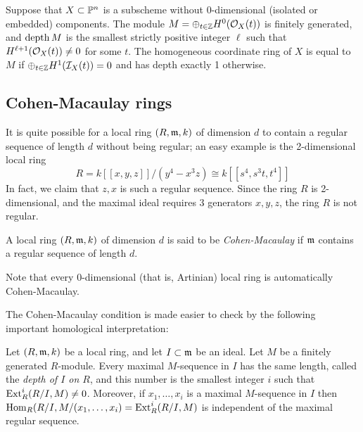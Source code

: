 \begin{theorem}\label{Auslander-Buchsbaum} Suppose that $X\subset \PP^{n}$ is a  subscheme without 0-dimensional (isolated or embedded) components. The module $M = \oplus_{t\in \ZZ}H^{0}(\cO_{X}(t))$
is finitely generated, and $\depth M$ is the smallest strictly positive integer $\ell$ such that 
$H^{\ell+1}(\cO_{X}(t)) \neq 0$  for some $t$. The homogeneous coordinate ring of $X$ is equal to $M$ if
$\oplus_{t\in \ZZ}H^{1}(\cI_{X}(t)) = 0$ and has depth exactly 1 otherwise.
\end{theorem}



 \subsection{Cohen-Macaulay rings}

 It is quite possible for a local ring $(R,\gm, k)$ of dimension $d$ to contain a regular sequence of length $d$
 without being regular; an easy example is the 2-dimensional local ring
 $$
 R = k[[x,y, z]]/(y^{4}-x^{3}z) \cong k[[s^{4}, s^{3}t, t^{4}]]
 $$
In fact, we claim that $z,x$ is such a regular sequence. Since the ring $R$ is 2-dimensional, and the maximal ideal requires 3 generators $x,y,z$, the ring $R$ is not regular. 

\begin{definition}
A local ring $(R,\gm,k)$ of dimension $d$ is said to be \emph{Cohen-Macaulay}  if $\gm$ contains a regular sequence of length $d$.
\end{definition}
 Note that every 0-dimensional (that is, Artinian) local ring is automatically Cohen-Macaulay.
 
The Cohen-Macaulay condition is made easier to check by the following important homological interpretation:

\begin{theorem}\label{depth}
Let $(R,\gm, k)$ be a local ring, and let $I\subset \gm$ be an ideal. 
Let $M$ be a finitely generated 
 $R$-module. Every maximal $M$-sequence in $I$ has the same length, called the \emph{depth of $I$ on $R$}, and this number is the smallest integer $i$ such that
 $\Ext^{i}_{R}(R/I, M)\neq 0$. Moreover, if $x_{1}, \dots, x_{i}$ is a maximal $M$-sequence
 in $I$ then $\Hom_{R}(R/I, M/(x_{1}, \dots, x_{i})= \Ext^{i}_{R}(R/I, M)$ is independent of the maximal regular sequence.
\end{theorem}
 

